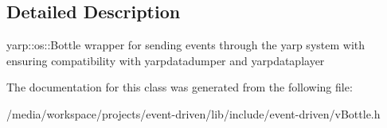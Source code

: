 \subsection{Detailed Description}
yarp\+::os\+::\+Bottle wrapper for sending events through the yarp system with ensuring compatibility with yarpdatadumper and yarpdataplayer 

The documentation for this class was generated from the following file\+:\begin{DoxyCompactItemize}
\item 
/media/workspace/projects/event-\/driven/lib/include/event-\/driven/v\+Bottle.\+h\end{DoxyCompactItemize}
